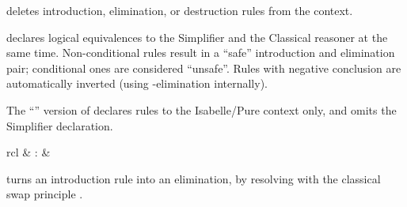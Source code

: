 \begin{isabellebody}
\begin{isamarkuptext}
\begin{descr}
  \item [\hyperlink{attribute.rule}{\mbox{\isa{rule}}}~\isa{del}] deletes introduction,
  elimination, or destruction rules from the context.

  \item [\hyperlink{attribute.iff}{\mbox{\isa{iff}}}] declares logical equivalences to the
  Simplifier and the Classical reasoner at the same time.
  Non-conditional rules result in a ``safe'' introduction and
  elimination pair; conditional ones are considered ``unsafe''.  Rules
  with negative conclusion are automatically inverted (using \isa{{\isachardoublequote}{\isasymnot}{\isachardoublequote}}-elimination internally).

  The ``\isa{{\isachardoublequote}{\isacharquery}{\isachardoublequote}}'' version of \hyperlink{attribute.iff}{\mbox{}} declares rules to
  the Isabelle/Pure context only, and omits the Simplifier
  declaration.

  \end{descr}%
\end{isamarkuptext}%
\isamarkuptrue%
%
\isamarkuptrue%
%
\begin{isamarkuptext}%
\begin{matharray}{rcl}
    \hypertarget{attribute.swapped}{\hyperlink{attribute.swapped}{\mbox{}}} & : & \isaratt \\
  \end{matharray}

  \begin{descr}

  \item [\hyperlink{attribute.swapped}{\mbox{\isa{swapped}}}] turns an introduction rule into an
  elimination, by resolving with the classical swap principle .


\end{descr}
\end{isamarkuptext}
\end{isabellebody}
